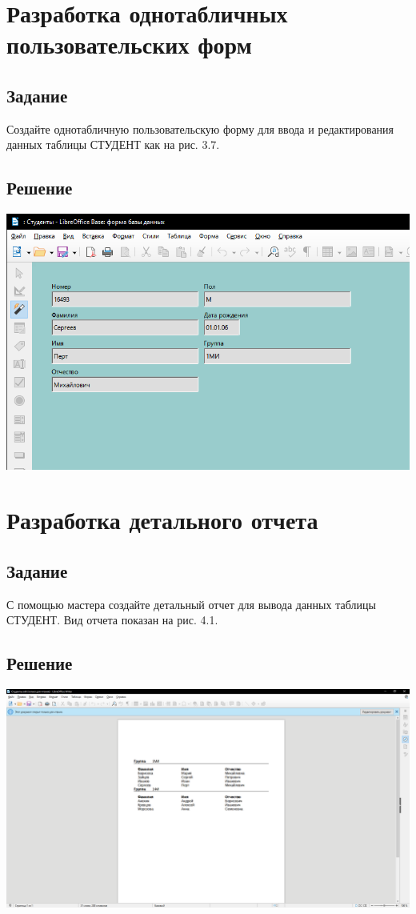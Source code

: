 \documentclass[a4paper, 12pt]{article}
\begin{document}
\section{Разработка однотабличных пользовательских форм }
\subsection{Задание}
Создайте  однотабличную  пользовательскую  форму  для  ввода  и 
редактирования данных таблицы СТУДЕНТ как на рис. 3.7. 
\subsection{Решение}
\includegraphics[width=\textwidth]{"3-1.png"}\\

\section{Разработка детального отчета}
\subsection{Задание}
С помощью мастера создайте детальный отчет для вывода данных 
таблицы СТУДЕНТ. Вид отчета показан на рис. 4.1. 
\subsection{Решение}
\includegraphics[width=\textwidth]{"4-1.png"}\\
\end{document}
